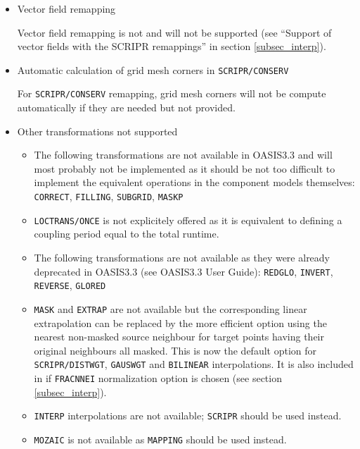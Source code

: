 \begin{itemize}

\item Vector field remapping

Vector field remapping is not and will not be supported (see ``Support
  of vector fields with the SCRIPR remappings'' in section \ref{subsec_interp}).

\item Automatic calculation of grid mesh corners in {\tt SCRIPR/CONSERV}

For {\tt SCRIPR/CONSERV} remapping, grid mesh corners will not
  be compute automatically if they are needed but not provided.  

\item Other transformations not supported

\begin{itemize}

\item The following transformations are not available in OASIS3.3
and will most probably not be implemented as it should be not
too difficult to implement the equivalent operations in the component
models themselves: {\tt CORRECT}, {\tt FILLING}, {\tt SUBGRID}, {\tt MASKP}

\item {\tt LOCTRANS/ONCE} is not explicitely offered as it is equivalent to
defining a coupling period equal to the total runtime.

\item The following transformations are not available as they were already
deprecated in OASIS3.3 (see OASIS3.3 User Guide): {\tt REDGLO}, {\tt INVERT},
{\tt REVERSE}, {\tt GLORED}

\item {\tt MASK} and {\tt EXTRAP} are not available but the corresponding
linear extrapolation can be replaced by the more efficient option
using the nearest non-masked source neighbour for target points having
their original neighbours all masked. This is now the default option for {\tt SCRIPR/}{\tt DISTWGT}, {\tt GAUSWGT} and {\tt BILINEAR} interpolations. It is
also included in  if {\tt FRACNNEI}
normalization option is chosen (see section \ref{subsec_interp}).

\item {\tt INTERP} interpolations are not available; {\tt SCRIPR}
  should be used instead.

\item {\tt MOZAIC} is not available as {\tt MAPPING} should be used
  instead.


\end{itemize}
\end{itemize}
